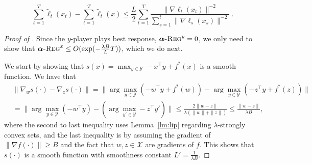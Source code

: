 \documentclass[pmlr]{jmlr} %
\def\argmin{\mathop{\arg\min}}
\def\balpha{\boldsymbol{\alpha}}
\newcommand{\regret}[1]{\balpha\textsc{-Reg}^{#1}}
\newcommand{\XX}{\mathcal{X}}
\newcommand{\YY}{\mathcal{Y}}
\begin{document}
\begin{equation} \label{eq:RegretStronglycVX}
\sum_{t=1}^{T} \tilde{\ell}_{t}(x_{t})-\sum_{t=1}^{T} \tilde{\ell}_{t}(x) 
\le 
\frac{L}{2} \sum_{t=1}^{T} \frac{\| \nabla \ell_{t}(x_{t}) \|^{-2}}{\sum_{s=1}^{t} \| \nabla \ell_{s}(x_{s}) \|^{-2}}~.
\end{equation}



\begin{proof}[Proof of ]
Since the $y$-player plays best response, $\regret{y}=0$, we only need to show that
$\regret{x} \leq O(\exp(-\frac{\lambda B}{L} T))$, which we do next.



We start by showing that $s(x) = \max_{y \in \YY} - x^{\top} y + f^{*}(x)$ is a smooth function.
We have that 
\begin{equation}
\begin{aligned}
& \| \nabla_{w} s(\cdot) - \nabla_{z} s(\cdot) \| = 
\| \arg\max_{y \in \YY} ( - w^{\top} y + f^{*}(w) ) -  \arg\max_{y \in \YY} ( - z^{\top} y + f^{*}(z) ) \|
\\ &= \| \arg\max_{y \in \YY} ( - w^{\top} y) - (\arg\max_{y' \in \YY}  - z^{\top} y') \|
\leq  \frac{ 2 \| w - z \|}{ \lambda ( \| w\| + \| z\| ) }
\leq  \frac{ \| w - z \|}{ \lambda B},
\end{aligned}
\end{equation}
where the second to last inequality uses Lemma~\ref{lm:lip} regarding $\lambda$-strongly convex sets,
and the last inequality is by assuming the gradient of $\| \nabla f(\cdot)\| \geq B$
and the fact that $w,z \in \XX$ are gradients of $f$.
This shows that $s(\cdot)$ is a smooth function with smoothness constant $L'=\frac{1}{\lambda B}$.


\begin{comment}
Also note that the global minimum of $s(\cdot)$ lies in $\XX$. In order to see this let us denote by
$y^{*} = \argmin_{y\in \YY}f(y)$. Then clearly,
\begin{align}
\min_{x\in\XX}s(x) = \min_{x\in\XX}\max_{y\in \YY}\{- x^{\top} y + f^{*}(x)\}  = \min_{x\in\XX}\{- x^{\top} y^{*} + f^{*}(x)\} 
=\nabla f(y^{*}) \in\XX
\end{align}


Note that since we assume that the optimum point of the underlying function $f$ is in the interior of the constraint set, the gradient is always bounded below by a positive constant before reaching the optimum point.
So, we are fine here.
\jk{Can everyone check the above argument make sense?} \kal{this seems like a big problem if the minimum of $-x^{T} y + f^{*}(x)$ is contained in $\YY$. But why does this condition need to hold?}


\end{comment}
\end{proof}
\end{document}
